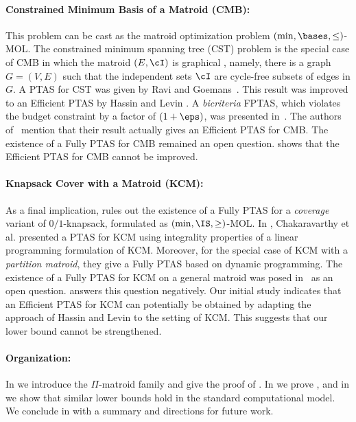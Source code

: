 
\paragraph{Constrained Minimum Basis of a Matroid (CMB):} This problem can be cast as the matroid optimization problem $(\min,\bases,\leq)$-MOL. 
The {\sc constrained minimum spanning tree (CST)} problem is the  special case of CMB in which the matroid $(E,\cI)$ is graphical \cite{RG96, andersen1996bicriterion,HL04,hong2004fully}, namely, there is a graph $G=(V,E)$ such that  
the independent sets $\cI$ are cycle-free subsets of edges in $G$.
A PTAS for CST was given by Ravi and Goemans~\cite{RG96}. This result was improved to an Efficient PTAS by Hassin and Levin \cite{HL04}. A {\em bicriteria} FPTAS, which violates the budget constraint by a factor of $(1+\eps)$, was presented in~\cite{hong2004fully}. The authors of~\cite{HL04} mention that their result actually gives an Efficient PTAS for CMB. 
The existence of a Fully PTAS for CMB remained an open question.  shows that the Efficient PTAS for CMB cannot be improved.
 
\paragraph{Knapsack Cover with a Matroid (KCM):}
As a final implication,  rules out the existence of a Fully PTAS for a  {\em coverage} variant of $0/1${\sc-knapsack}, formulated as $(\min,\IS,\geq)$-MOL. 
In \cite{CCNR13}, Chakaravarthy et al. presented a PTAS for KCM using integrality properties of a linear programming formulation of KCM. Moreover, for the special case of KCM with a {\em partition matroid}, they give a Fully PTAS based on dynamic programming. The existence of  a Fully PTAS for KCM  on a general matroid was posed in~\cite{CCNR13} as an open question.  answers this question negatively.
Our initial study indicates that an Efficient PTAS  for KCM can potentially be obtained by adapting the approach of Hassin and Levin \cite{HL04} to the setting of KCM. This suggests that our lower bound cannot be strengthened. 


\paragraph{Organization:}
\label{sec:organization}

In  we introduce the $\Pi$-matroid family and give the proof of . In  we prove , and in
  we show that similar lower bounds hold in the standard computational model. We conclude in  with a summary and directions for future work.